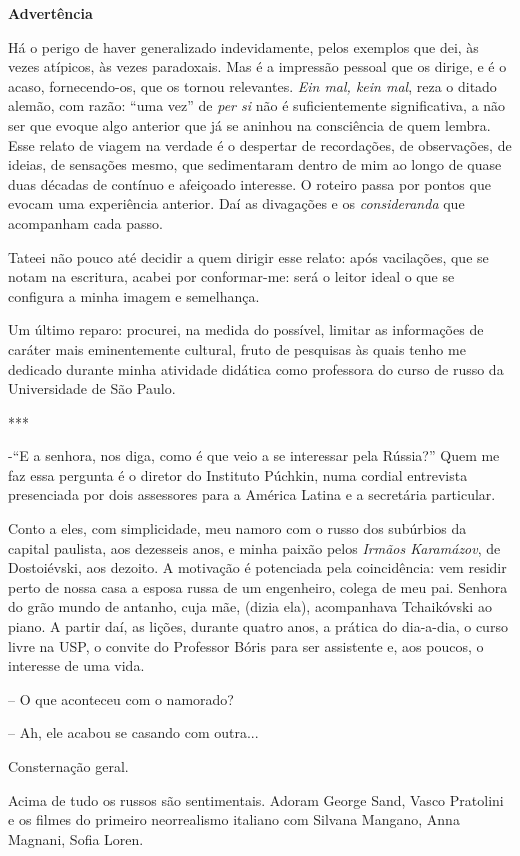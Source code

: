 \textbf{Advertência}

Há o perigo de haver generalizado indevidamente, pelos exemplos que dei,
às vezes atípicos, às vezes paradoxais. Mas é a impressão pessoal que os
dirige, e é o acaso, fornecendo-os, que os tornou relevantes. \emph{Ein
mal, kein mal}, reza o ditado alemão, com razão: ``uma vez'' de
\emph{per si} não é suficientemente significativa, a não ser que evoque
algo anterior que já se aninhou na consciência de quem lembra. Esse
relato de viagem na verdade é o despertar de recordações, de
observações, de ideias, de sensações mesmo, que sedimentaram dentro de
mim ao longo de quase duas décadas de contínuo e afeiçoado interesse. O
roteiro passa por pontos que evocam uma experiência anterior. Daí as
divagações e os \emph{consideranda} que acompanham cada passo.

Tateei não pouco até decidir a quem dirigir esse relato: após
vacilações, que se notam na escritura, acabei por conformar-me: será o
leitor ideal o que se configura a minha imagem e semelhança.

Um último reparo: procurei, na medida do possível, limitar as
informações de caráter mais eminentemente cultural, fruto de pesquisas
às quais tenho me dedicado durante minha atividade didática como
professora do curso de russo da Universidade de São Paulo.

***

-``E a senhora, nos diga, como é que veio a se interessar pela Rússia?''
Quem me faz essa pergunta é o diretor do Instituto Púchkin, numa cordial
entrevista presenciada por dois assessores para a América Latina e a
secretária particular.

Conto a eles, com simplicidade, meu namoro com o russo dos subúrbios da
capital paulista, aos dezesseis anos, e minha paixão pelos \emph{Irmãos
Karamázov}, de Dostoiévski, aos dezoito. A motivação é potenciada pela
coincidência: vem residir perto de nossa casa a esposa russa de um
engenheiro, colega de meu pai. Senhora do grão mundo de antanho, cuja
mãe, (dizia ela), acompanhava Tchaikóvski ao piano. A partir daí, as
lições, durante quatro anos, a prática do dia-a-dia, o curso livre na
USP, o convite do Professor Bóris para ser assistente e, aos poucos, o
interesse de uma vida.

-- O que aconteceu com o namorado?

-- Ah, ele acabou se casando com outra...

Consternação geral.

Acima de tudo os russos são sentimentais. Adoram George Sand, Vasco
Pratolini e os filmes do primeiro neorrealismo italiano com Silvana
Mangano, Anna Magnani, Sofia Loren.

